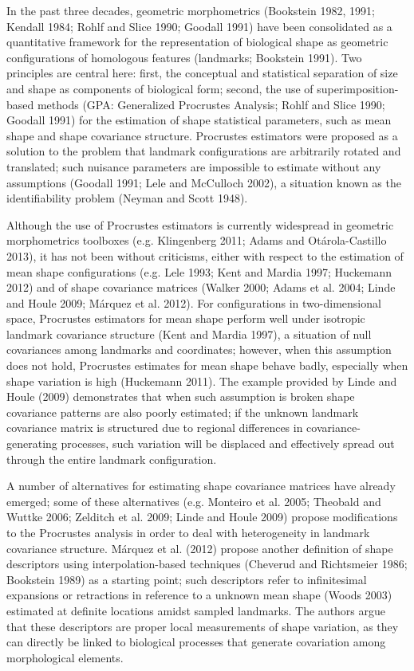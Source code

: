 \documentclass[12pt,]{article}
\begin{document}
In the past three decades, geometric morphometrics (Bookstein 1982,
1991; Kendall 1984; Rohlf and Slice 1990; Goodall 1991) have been
consolidated as a quantitative framework for the representation of
biological shape as geometric configurations of homologous features
(landmarks; Bookstein 1991). Two principles are central here: first, the
conceptual and statistical separation of size and shape as components of
biological form; second, the use of superimposition-based methods (GPA:
Generalized Procrustes Analysis; Rohlf and Slice 1990; Goodall 1991) for
the estimation of shape statistical parameters, such as mean shape and
shape covariance structure. Procrustes estimators were proposed as a
solution to the problem that landmark configurations are arbitrarily
rotated and translated; such nuisance parameters are impossible to
estimate without any assumptions (Goodall 1991; Lele and McCulloch
2002), a situation known as the identifiability problem (Neyman and
Scott 1948).

Although the use of Procrustes estimators is currently widespread in
geometric morphometrics toolboxes (e.g. Klingenberg 2011; Adams and
Otárola-Castillo 2013), it has not been without criticisms, either with
respect to the estimation of mean shape configurations (e.g. Lele 1993;
Kent and Mardia 1997; Huckemann 2012) and of shape covariance matrices
(Walker 2000; Adams et al. 2004; Linde and Houle 2009; Márquez et al.
2012). For configurations in two-dimensional space, Procrustes
estimators for mean shape perform well under isotropic landmark
covariance structure (Kent and Mardia 1997), a situation of null
covariances among landmarks and coordinates; however, when this
assumption does not hold, Procrustes estimates for mean shape behave
badly, especially when shape variation is high (Huckemann 2011). The
example provided by Linde and Houle (2009) demonstrates that when such
assumption is broken shape covariance patterns are also poorly
estimated; if the unknown landmark covariance matrix is structured due
to regional differences in covariance-generating processes, such
variation will be displaced and effectively spread out through the
entire landmark configuration.

A number of alternatives for estimating shape covariance matrices have
already emerged; some of these alternatives (e.g. Monteiro et al. 2005;
Theobald and Wuttke 2006; Zelditch et al. 2009; Linde and Houle 2009)
propose modifications to the Procrustes analysis in order to deal with
heterogeneity in landmark covariance structure. Márquez et al. (2012)
propose another definition of shape descriptors using
interpolation-based techniques (Cheverud and Richtsmeier 1986; Bookstein
1989) as a starting point; such descriptors refer to infinitesimal
expansions or retractions in reference to a unknown mean shape (Woods
2003) estimated at definite locations amidst sampled landmarks. The
authors argue that these descriptors are proper local measurements of
shape variation, as they can directly be linked to biological processes
that generate covariation among morphological elements.
\end{document}
